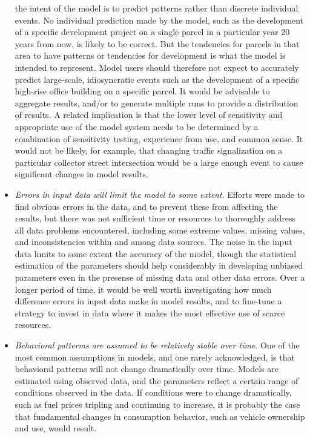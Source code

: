 \begin{itemize}
the intent of the model is to predict patterns rather than discrete
individual events. No individual prediction made by the model, such
as the development of a specific development project on a single parcel
in a particular year 20 years from now, is likely to be correct.
But the tendencies for parcels in that area to have patterns or tendencies
for development is what the model is intended to represent. Model
users should therefore not expect to accurately predict large-scale,
idiosyncratic events such as the development of a specific high-rise office
building on a specific parcel. It would be advisable to aggregate
results, and/or to generate multiple runs to provide a distribution
of results. A related implication is that the lower level of sensitivity
and appropriate use of the model system needs to be determined by
a combination of sensitivity testing, experience from use, and common
sense. It would not be likely, for example, that changing traffic
signalization on a particular collector street intersection would
be a large enough event to cause significant changes in model results.
\item \emph{Errors in input data will limit the model to some extent}. Efforts
were made to find obvious errors in the data, and to prevent these
from affecting the results, but there was not sufficient time or resources
to thoroughly address all data problems encountered, including some
extreme values, missing values, and inconsistencies within and among
data sources. The noise in the input data limits to some extent the
accuracy of the model, though the statistical estimation of the parameters
should help considerably in developing unbiased parameters even in
the presense of missing data and other data errors. Over a longer
period of time, it would be well worth investigating how much difference
errors in input data make in model results, and to fine-tune a strategy
to invest in data where it makes the most effective use of scarce
resources.
\item \emph{Behavioral patterms are assumed to be relatively stable over
time}. One of the most common assumptions in models, and one rarely
acknowledged, is that behavioral patterns will not change dramatically
over time. Models are estimated using observed data, and the parameters
reflect a certain range of conditions observed in the data. If conditions
were to change dramatically, such as fuel prices tripling and continuing
to increase, it is probably the case that fundamental changes in consumption
behavior, such as vehicle ownership and use, would result.
\end{itemize}


